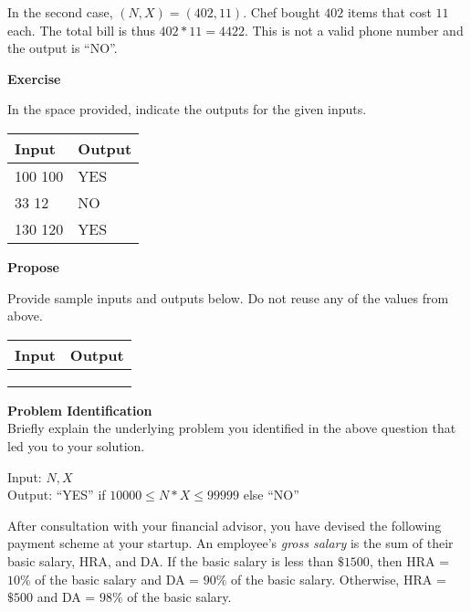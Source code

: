 \documentclass[a4paper]{exam}
\newcommand\heading[1]{\textbf{#1}}
\begin{document}
\begin{questions}
    In the second case, $(N,X)=(402,11)$. Chef bought $402$ items that cost $11$ each. The total bill is thus $402 * 11 = 4422$. This is not a valid phone number and the output is ``NO''.

    \heading{Exercise}

    In the space provided, indicate the outputs for the given inputs.

    \begin{tabularx}{\textwidth}{|X|X|}
        \rowcolor{gray!50}
        \hline
        Input   & Output \\ \hline\hline
        100 100 & YES    \\\hline
        33 12   & NO     \\\hline
        130 120 & YES    \\\hline
    \end{tabularx}

    \heading{Propose}

    Provide sample inputs and outputs below. Do not reuse any of the values from above.

    \begin{tabularx}{\textwidth}{|X|X|}
        \rowcolor{gray!50}
        \hline
        Input & Output \\ \hline\hline
              &        \\\hline
              &        \\\hline
              &        \\\hline
    \end{tabularx}

    \heading{Problem Identification}\\
    Briefly explain the underlying problem you identified in the above question that led you to your solution.

  \begin{mdframed}
    Input: $N,X$\\
    Output: ``YES'' if $10000 \leq N*X \leq 99999$ else ``NO''
  \end{mdframed}


    After consultation with your financial advisor, you have devised the following payment scheme at your startup. An employee's \textit{gross salary} is the sum of their basic salary, HRA, and DA. If the basic salary is less than $\$ 1500$, then HRA = $10\%$ of the basic salary and DA = $90\%$ of the basic salary. Otherwise, HRA = $\$ 500$ and DA = $98\%$ of the basic salary.


\end{questions}
\end{document}
